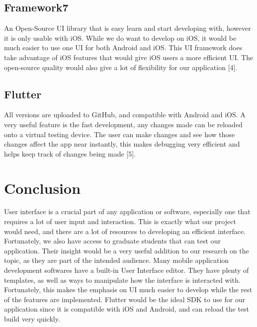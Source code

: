 \documentclass[a4paper, 11pt]{article} %
\begin{document}
    \subsection{Framework7} An Open-Source UI library that is easy learn and start developing with, however it is only usable with iOS. While we do want to develop on iOS, it would be much easier to use one UI for both Android and iOS. This UI framework does take advantage of iOS features that would give iOS users a more efficient UI. The open-source quality would also give a lot of flexibility for our application [4].
    \subsection{Flutter} All versions are uploaded to GitHub, and compatible with Android and iOS. A very useful feature is the fast development, any changes made can be reloaded onto a virtual testing device. The user can make changes and see how those changes affect the app near instantly, this makes debugging very efficient and helps keep track of changes being made [5].



\section{Conclusion}
    User interface is a crucial part of any application or software, especially one that requires a lot of user input and interaction. This is exactly what our project would need, and there are a lot of resources to developing an efficient interface. Fortunately, we also have access to graduate students that can test our application. Their insight would be a very useful addition to our research on the topic, as they are part of the intended audience. Many mobile application development softwares have a built-in User Interface editor. They have plenty of templates, as well as ways to manipulate how the interface is interacted with. Fortunately, this makes the emphasis on UI much easier to develop while the rest of the features are implemented. Flutter would be the ideal SDK to use for our application since it is compatible with iOS and Android, and can reload the test build very quickly.

\newpage


\end{document}
